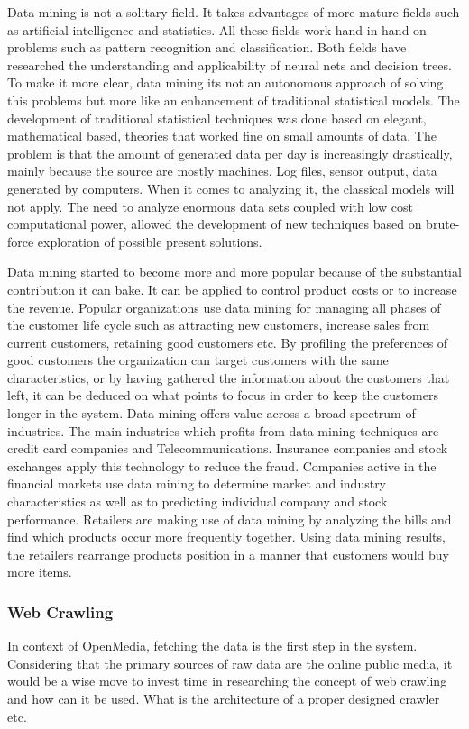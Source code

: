 Data mining is not a solitary field. It takes advantages of more mature fields such as artificial intelligence and statistics. All these fields work hand in hand on problems such as pattern recognition and classification. Both fields have researched the understanding and applicability of neural nets and decision trees. To make it more clear, data mining its not an autonomous approach of solving this problems but more like an enhancement of traditional statistical models. The development of traditional statistical techniques was done based on elegant, mathematical based, theories that worked fine on small amounts of data. The problem is that the amount of generated data per day is increasingly drastically, mainly because the source are mostly machines. Log files, sensor output, data generated by computers. When it comes to analyzing it, the classical models will not apply. The need to analyze enormous data sets coupled with low cost computational power, allowed the development of new techniques based on brute-force exploration of possible present solutions.

Data mining started to become more and more popular because of the substantial contribution it can bake. It can be applied to control product costs or to increase the revenue. Popular organizations use data mining for managing all phases of the customer life cycle such as attracting new customers, increase sales from current customers, retaining good customers etc.
By profiling the preferences of good customers the organization can target customers with the same characteristics, or by having gathered the information about the customers that left, it can be deduced on what points to focus in order to keep the customers longer in the system. Data mining offers value across a broad spectrum of industries. The main industries which profits from data mining techniques are credit card companies and Telecommunications. Insurance companies and stock exchanges apply this technology to reduce the fraud. Companies active in the financial markets use data mining to determine market and industry characteristics as well as to predicting individual company and stock performance. Retailers are making use of data mining by analyzing the bills and find which products occur more frequently together. Using data mining results, the retailers rearrange products position in a manner that customers would buy more items.

\subsubsection{Web Crawling}
In context of OpenMedia, fetching the data is the first step in the system. Considering that the primary sources of raw data are the online public media, it would be a wise move to invest time in researching the concept of web crawling and how can it be used. What is the architecture of a proper designed crawler etc.

